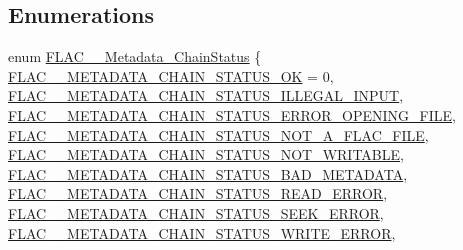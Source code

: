 \subsection*{Enumerations}
\begin{DoxyCompactItemize}
\item 
enum \hyperlink{group__flac__metadata__level2_gafe2a924893b0800b020bea8160fd4531}{F\+L\+A\+C\+\_\+\+\_\+\+Metadata\+\_\+\+Chain\+Status} \{ \newline
\hyperlink{group__flac__metadata__level2_ggafe2a924893b0800b020bea8160fd4531a293be942ec54576f2b3c73613af968e9}{F\+L\+A\+C\+\_\+\+\_\+\+M\+E\+T\+A\+D\+A\+T\+A\+\_\+\+C\+H\+A\+I\+N\+\_\+\+S\+T\+A\+T\+U\+S\+\_\+\+OK} = 0, 
\hyperlink{group__flac__metadata__level2_ggafe2a924893b0800b020bea8160fd4531a1be9400982f411173af46bf0c3acbdc7}{F\+L\+A\+C\+\_\+\+\_\+\+M\+E\+T\+A\+D\+A\+T\+A\+\_\+\+C\+H\+A\+I\+N\+\_\+\+S\+T\+A\+T\+U\+S\+\_\+\+I\+L\+L\+E\+G\+A\+L\+\_\+\+I\+N\+P\+UT}, 
\hyperlink{group__flac__metadata__level2_ggafe2a924893b0800b020bea8160fd4531a43d2741a650576052fa3615d8cd64d86}{F\+L\+A\+C\+\_\+\+\_\+\+M\+E\+T\+A\+D\+A\+T\+A\+\_\+\+C\+H\+A\+I\+N\+\_\+\+S\+T\+A\+T\+U\+S\+\_\+\+E\+R\+R\+O\+R\+\_\+\+O\+P\+E\+N\+I\+N\+G\+\_\+\+F\+I\+LE}, 
\hyperlink{group__flac__metadata__level2_ggafe2a924893b0800b020bea8160fd4531a99748a4b12ed10f9368375cc8deeb143}{F\+L\+A\+C\+\_\+\+\_\+\+M\+E\+T\+A\+D\+A\+T\+A\+\_\+\+C\+H\+A\+I\+N\+\_\+\+S\+T\+A\+T\+U\+S\+\_\+\+N\+O\+T\+\_\+\+A\+\_\+\+F\+L\+A\+C\+\_\+\+F\+I\+LE}, 
\newline
\hyperlink{group__flac__metadata__level2_ggafe2a924893b0800b020bea8160fd4531ac469c6543ebb117e99064572c16672d4}{F\+L\+A\+C\+\_\+\+\_\+\+M\+E\+T\+A\+D\+A\+T\+A\+\_\+\+C\+H\+A\+I\+N\+\_\+\+S\+T\+A\+T\+U\+S\+\_\+\+N\+O\+T\+\_\+\+W\+R\+I\+T\+A\+B\+LE}, 
\hyperlink{group__flac__metadata__level2_ggafe2a924893b0800b020bea8160fd4531a8efd2c76dc06308eb6eba59e1bc6300b}{F\+L\+A\+C\+\_\+\+\_\+\+M\+E\+T\+A\+D\+A\+T\+A\+\_\+\+C\+H\+A\+I\+N\+\_\+\+S\+T\+A\+T\+U\+S\+\_\+\+B\+A\+D\+\_\+\+M\+E\+T\+A\+D\+A\+TA}, 
\hyperlink{group__flac__metadata__level2_ggafe2a924893b0800b020bea8160fd4531a0525de5fb5d8aeeb4e848e33a8d503c6}{F\+L\+A\+C\+\_\+\+\_\+\+M\+E\+T\+A\+D\+A\+T\+A\+\_\+\+C\+H\+A\+I\+N\+\_\+\+S\+T\+A\+T\+U\+S\+\_\+\+R\+E\+A\+D\+\_\+\+E\+R\+R\+OR}, 
\hyperlink{group__flac__metadata__level2_ggafe2a924893b0800b020bea8160fd4531a5814bc26bcf92143198b8e7f028f43a2}{F\+L\+A\+C\+\_\+\+\_\+\+M\+E\+T\+A\+D\+A\+T\+A\+\_\+\+C\+H\+A\+I\+N\+\_\+\+S\+T\+A\+T\+U\+S\+\_\+\+S\+E\+E\+K\+\_\+\+E\+R\+R\+OR}, 
\newline
\hyperlink{group__flac__metadata__level2_ggafe2a924893b0800b020bea8160fd4531a66460c735e4745788b40889329e8489f}{F\+L\+A\+C\+\_\+\+\_\+\+M\+E\+T\+A\+D\+A\+T\+A\+\_\+\+C\+H\+A\+I\+N\+\_\+\+S\+T\+A\+T\+U\+S\+\_\+\+W\+R\+I\+T\+E\+\_\+\+E\+R\+R\+OR}, 

\end{DoxyCompactItemize}

